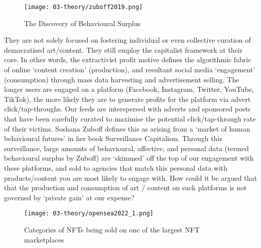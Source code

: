 \begin{figure}[ht]
    \centering
    \texttt{[image: 03-theory/zuboff2019.png]}
    \captionsetup{justification=centering,margin=1.5cm}
    \caption{The Discovery of Behavioural Surplus \citep[in][]{zuboff2019}}\label{fig: zuboff2019}
\end{figure}

They are not solely focused on fostering individual or even collective curation of democratised art/content. They still employ the capitalist framework at their core. In other words, the extractivist profit motive defines the algorithmic fabric of online `content creation' (production), and resultant social media `engagement' (consumption) through mass data harvesting and advertisement selling. The longer users are engaged on a platform (Facebook, Instagram, Twitter, YouTube, TikTok), the more likely they are to generate profits for the platform via advert click/tap-throughs. Our feeds are interspersed with adverts and sponsored posts that have been carefully curated to maximise the potential click/tap-through rate of their victims. Soshana Zuboff defines this as arising from a `market of human behavioural futures' \citeyearpar{zuboff2019} in her book Surveillance Capitalism. Through this surveillance, large amounts of behavioural, affective, and personal data (termed behavioural surplus by Zuboff) are `skimmed' off the top of our engagement with these platforms, and sold to agencies that match this personal data with products/content you are most likely to engage with. How could it be argued that that the production and consumption of art / content on such platforms is not governed by `private gain' at our expense? 

\begin{figure}[ht]
    \centering
    \texttt{[image: 03-theory/opensea2022\_1.png]}
    \captionsetup{justification=centering,margin=1.5cm}
    \caption{Categories of NFTs being sold on one of the largest NFT marketplaces \citep[from][]{opensea2022a}}\label{fig: opensea2022_1}
\end{figure}

